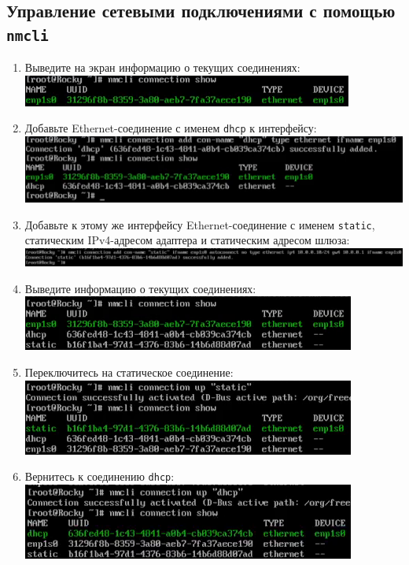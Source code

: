 \documentclass[12pt]{article}
\begin{document}
\subsection{Управление сетевыми подключениями с помощью \texttt{nmcli}}
\begin{enumerate}
	\item Выведите на экран информацию о текущих соединениях:
	      \\\includegraphics{7.png}
	\item Добавьте Ethernet-соединение с именем \texttt{dhcp} к интерфейсу:
	      \\\includegraphics{8.png}
	\item Добавьте к этому же интерфейсу Ethernet-соединение с именем \texttt{static}, статическим IPv4-адресом адаптера и статическим адресом шлюза:
	      \\\includegraphics{9.png}
	\item Выведите информацию о текущих соединениях:
	      \\\includegraphics{10.png}
	\item Переключитесь на статическое соединение:
	      \\\includegraphics{11.png}
	\item Вернитесь к соединению \texttt{dhcp}:
	      \\\includegraphics{12.png}
\end{enumerate}
\end{document}
